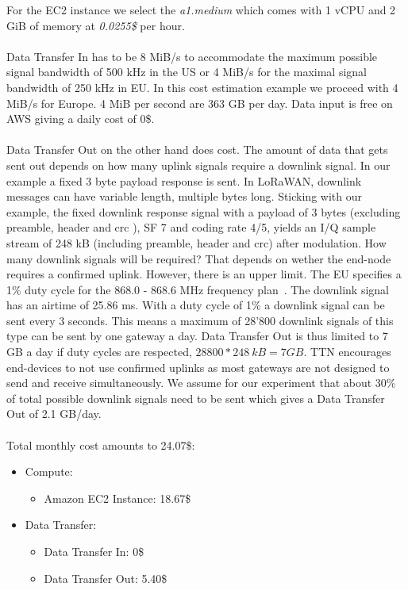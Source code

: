 For the EC2 instance we select the \emph{a1.medium} which comes with 1 vCPU and 2 GiB of memory at \emph{0.0255\$} per hour.
\\
\\
Data Transfer In has to be 8 MiB/s to accommodate the maximum possible signal bandwidth of 500 kHz in the US or 
4 MiB/s for the maximal signal bandwidth of 250 kHz in EU. In this cost estimation example we proceed with 4 MiB/s for Europe.
4 MiB per second are 363 GB per day. Data input is free on AWS giving a daily cost of 0\$.
\\
\\
Data Transfer Out on the other hand does cost. The amount of data that gets sent out depends on
how many uplink signals require a downlink signal. In our example a fixed 3 byte payload response is sent.
In LoRaWAN, downlink messages can have variable length, multiple bytes long.
Sticking with our example, the fixed downlink response signal with a payload of 3 bytes (excluding preamble, header and crc ), SF 7 and coding rate 4/5,
yields an I/Q sample stream of 248 kB (including preamble, header and crc) after modulation.
How many downlink signals will be required? That depends on wether the end-node requires a confirmed uplink.
However, there is an upper limit. The EU specifies a 1\% duty cycle for the 868.0 - 868.6 MHz frequency plan~\cite{duty_cycle}.
The downlink signal has an airtime of 25.86 ms. With a duty cycle of 1\% a downlink signal can be sent every 3 seconds.
This means a maximum of 28'800 downlink signals of this type can be sent by one gateway a day.
Data Transfer Out is thus limited to 7 GB a day if duty cycles are respected, $28800 * 248~kB = 7 GB$.
TTN encourages end-devices to not use confirmed uplinks as most gateways are not designed to send and receive
simultaneously. We assume for our experiment that about 30\% of total possible downlink signals need to be sent
which gives a Data Transfer Out of 2.1 GB/day.
\\
\\
Total monthly cost amounts to 24.07\$:
\begin{itemize}
    \item Compute:
    \begin{itemize}
        \item  Amazon EC2 Instance: 18.67\$
    \end{itemize}
    \item  Data Transfer:
    \begin{itemize}
        \item Data Transfer In: 0\$
        \item Data Transfer Out: 5.40\$  
    \end{itemize}
\end{itemize}

